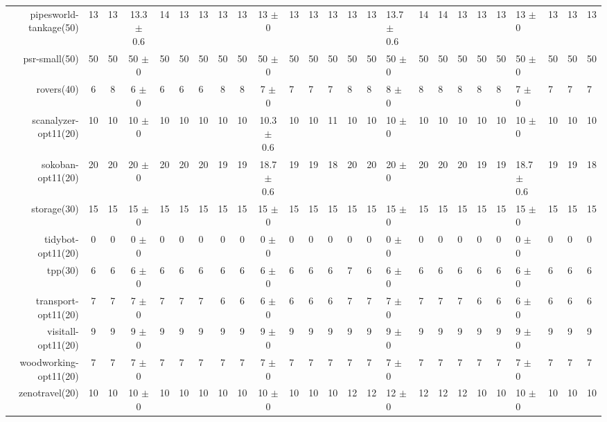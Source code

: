 \begin{center}
\begin{tabular}{|rcccHHH|cccHHHHHHHHHHHHHHH|}
pipesworld-tankage(50) & 13 & 13 & 13.3 $\pm$ 0.6 & 14 & 13 & 13 & 13 & 13 & 13 $\pm$ 0 & 13 & 13 & 13 & 13 & 13 & 13.7 $\pm$ 0.6 & 14 & 14 & 13 & 13 & 13 & 13 $\pm$ 0 & 13 & 13 & 13\\
psr-small(50) & 50 & 50 & 50 $\pm$ 0 & 50 & 50 & 50 & 50 & 50 & 50 $\pm$ 0 & 50 & 50 & 50 & 50 & 50 & 50 $\pm$ 0 & 50 & 50 & 50 & 50 & 50 & 50 $\pm$ 0 & 50 & 50 & 50\\
rovers(40) & 6 & 8 & 6 $\pm$ 0 & 6 & 6 & 6 & 8 & 8 & 7 $\pm$ 0 & 7 & 7 & 7 & 8 & 8 & 8 $\pm$ 0 & 8 & 8 & 8 & 8 & 8 & 7 $\pm$ 0 & 7 & 7 & 7\\
scanalyzer-opt11(20) & 10 & 10 & 10 $\pm$ 0 & 10 & 10 & 10 & 10 & 10 & 10.3 $\pm$ 0.6 & 10 & 10 & 11 & 10 & 10 & 10 $\pm$ 0 & 10 & 10 & 10 & 10 & 10 & 10 $\pm$ 0 & 10 & 10 & 10\\
sokoban-opt11(20) & 20 & 20 & 20 $\pm$ 0 & 20 & 20 & 20 & 19 & 19 & 18.7 $\pm$ 0.6 & 19 & 19 & 18 & 20 & 20 & 20 $\pm$ 0 & 20 & 20 & 20 & 19 & 19 & 18.7 $\pm$ 0.6 & 19 & 19 & 18\\
storage(30) & 15 & 15 & 15 $\pm$ 0 & 15 & 15 & 15 & 15 & 15 & 15 $\pm$ 0 & 15 & 15 & 15 & 15 & 15 & 15 $\pm$ 0 & 15 & 15 & 15 & 15 & 15 & 15 $\pm$ 0 & 15 & 15 & 15\\
tidybot-opt11(20) & 0 & 0 & 0 $\pm$ 0 & 0 & 0 & 0 & 0 & 0 & 0 $\pm$ 0 & 0 & 0 & 0 & 0 & 0 & 0 $\pm$ 0 & 0 & 0 & 0 & 0 & 0 & 0 $\pm$ 0 & 0 & 0 & 0\\
tpp(30) & 6 & 6 & 6 $\pm$ 0 & 6 & 6 & 6 & 6 & 6 & 6 $\pm$ 0 & 6 & 6 & 6 & 7 & 6 & 6 $\pm$ 0 & 6 & 6 & 6 & 6 & 6 & 6 $\pm$ 0 & 6 & 6 & 6\\
transport-opt11(20) & 7 & 7 & 7 $\pm$ 0 & 7 & 7 & 7 & 6 & 6 & 6 $\pm$ 0 & 6 & 6 & 6 & 7 & 7 & 7 $\pm$ 0 & 7 & 7 & 7 & 6 & 6 & 6 $\pm$ 0 & 6 & 6 & 6\\
visitall-opt11(20) & 9 & 9 & 9 $\pm$ 0 & 9 & 9 & 9 & 9 & 9 & 9 $\pm$ 0 & 9 & 9 & 9 & 9 & 9 & 9 $\pm$ 0 & 9 & 9 & 9 & 9 & 9 & 9 $\pm$ 0 & 9 & 9 & 9\\
woodworking-opt11(20) & 7 & 7 & 7 $\pm$ 0 & 7 & 7 & 7 & 7 & 7 & 7 $\pm$ 0 & 7 & 7 & 7 & 7 & 7 & 7 $\pm$ 0 & 7 & 7 & 7 & 7 & 7 & 7 $\pm$ 0 & 7 & 7 & 7\\
zenotravel(20) & 10 & 10 & 10 $\pm$ 0 & 10 & 10 & 10 & 10 & 10 & 10 $\pm$ 0 & 10 & 10 & 10 & 12 & 12 & 12 $\pm$ 0 & 12 & 12 & 12 & 10 & 10 & 10 $\pm$ 0 & 10 & 10 & 10\\
\hline
\end{tabular}
\end{center}
